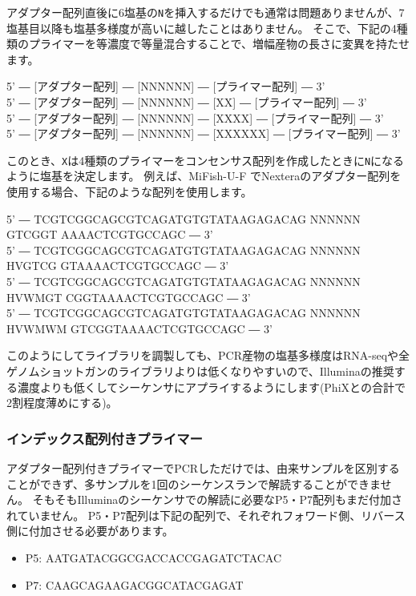 \documentclass[titlepage,10pt,a4paper]{jsbook}
\newenvironment{pre}{\begin{leftbar}\raggedright\ttfamily\footnotesize\setlength{\baselineskip}{1.4em}}{\end{leftbar}\vspace{-1em}}
\begin{document}
アダプター配列直後に6塩基の\texttt{N}を挿入するだけでも通常は問題ありませんが、7塩基目以降も塩基多様度が高いに越したことはありません。
そこで、下記の4種類のプライマーを等濃度で等量混合することで、増幅産物の長さに変異を持たせます。

\begin{pre}
5' ― [アダプター配列] ― [NNNNNN] ― [プライマー配列] ― 3'\\
5' ― [アダプター配列] ― [NNNNNN] ― [XX] ― [プライマー配列] ― 3'\\
5' ― [アダプター配列] ― [NNNNNN] ― [XXXX] ― [プライマー配列] ― 3'\\
5' ― [アダプター配列] ― [NNNNNN] ― [XXXXXX] ― [プライマー配列] ― 3'
\end{pre}

このとき、\texttt{X}は4種類のプライマーをコンセンサス配列を作成したときに\texttt{N}になるように塩基を決定します。
例えば、MiFish-U-F \citep{Miya2015}でNexteraのアダプター配列を使用する場合、下記のような配列を使用します。

\begin{pre}
5' ― TCGTCGGCAGCGTCAGATGTGTATAAGAGACAG NNNNNN GTCGGT AAAACTCGTGCCAGC ― 3'\\
5' ― TCGTCGGCAGCGTCAGATGTGTATAAGAGACAG NNNNNN HVGTCG GTAAAACTCGTGCCAGC ― 3'\\
5' ― TCGTCGGCAGCGTCAGATGTGTATAAGAGACAG NNNNNN HVWMGT CGGTAAAACTCGTGCCAGC ― 3'\\
5' ― TCGTCGGCAGCGTCAGATGTGTATAAGAGACAG NNNNNN HVWMWM GTCGGTAAAACTCGTGCCAGC ― 3'
\end{pre}

このようにしてライブラリを調製しても、PCR産物の塩基多様度はRNA-seqや全ゲノムショットガンのライブラリよりは低くなりやすいので、Illuminaの推奨する濃度よりも低くしてシーケンサにアプライするようにします(PhiXとの合計で2割程度薄めにする)。

\subsubsection{インデックス配列付きプライマー}

アダプター配列付きプライマーでPCRしただけでは、由来サンプルを区別することができず、多サンプルを1回のシーケンスランで解読することができません。
そもそもIlluminaのシーケンサでの解読に必要なP5・P7配列もまだ付加されていません。
P5・P7配列は下記の配列で、それぞれフォワード側、リバース側に付加させる必要があります。

\begin{itemize}
\item P5: AATGATACGGCGACCACCGAGATCTACAC
\item P7: CAAGCAGAAGACGGCATACGAGAT
\end{itemize}
\end{document}
